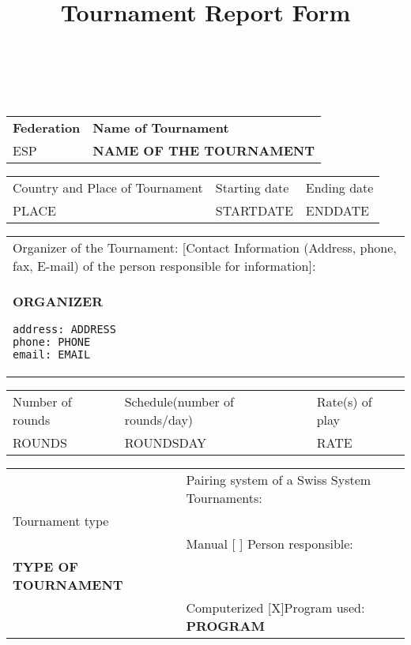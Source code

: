 \documentclass[11pt, a4paper]{article}
\title{Tournament Report Form}
\date{}
\author{}
\begin{document}
\thispagestyle{empty}

\begin{table}[ht]
\\
\\
\small
\noindent\begin{tabular}{|p{5cm}|p{10.97cm}|}
\hline
{\bfseries Federation}&{\bfseries Name of Tournament}\\
\normalsize ESP&\bfseries\normalsize NAME OF THE TOURNAMENT\\
\hline
\end{tabular}

\noindent\begin{tabular}{|p{11cm}|p{2.28cm}|p{2.27cm}|}
Country and Place of Tournament&Starting date&Ending date\\
PLACE&STARTDATE&ENDDATE \\
\hline
\end{tabular}

\noindent\begin{tabular}{|p{16.4cm}|}
Organizer of the Tournament: [Contact Information (Address, phone, fax, E-mail) of the person responsible for information]:\\
{\normalsize\bfseries ORGANIZER}
\begin{verbatim}
address: ADDRESS
phone: PHONE
email: EMAIL
\end{verbatim}
\\
\hline
\end{tabular}

\noindent\begin{tabular}{|p{5cm}|p{5.4cm}|p{5.15cm}|}
Number of rounds&Schedule(number of rounds/day)&Rate(s) of play\\
ROUNDS&ROUNDSDAY&RATE\\
\hline
\end{tabular}

\noindent\begin{tabular}{|p{4cm}|p{11.97cm}|}
&Pairing system of a Swiss System Tournaments:\\
Tournament type&\\
&Manual\hspace{1cm} [ ]\hspace{1cm} Person responsible:\\
{\bfseries \normalsize TYPE OF TOURNAMENT}& \\
&Computerized [X]\hspace{1cm}Program used: {\bfseries PROGRAM}\\
\hline
\end{tabular}


\end{table}
\end{document}
